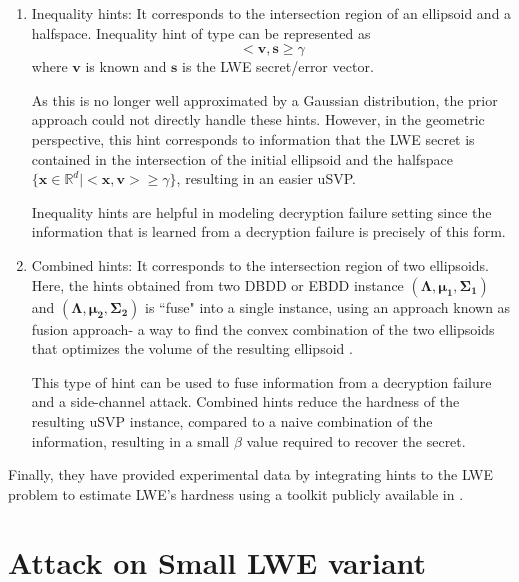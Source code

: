 \begin{enumerate}
    \item Inequality hints: It corresponds to the intersection region of an ellipsoid and a halfspace. Inequality hint of type can be represented as
          \begin{equation*}
              <\pmb{v},\pmb{s} \geq \gamma
          \end{equation*}
          where $\pmb{v}$ is known and $\pmb{s}$ is the LWE secret/error vector.

          As this is no longer well approximated by a Gaussian distribution, the prior approach could not directly handle these hints. However, in the geometric perspective, this hint corresponds to information that the LWE secret is contained in the intersection of the initial ellipsoid and the halfspace $\{ \pmb{x} \in \mathbb{R}^d | < \pmb{x, v} > \geq \gamma \}$, resulting in an easier uSVP.

          Inequality hints are helpful in modeling decryption failure setting since the information that is learned from a decryption failure is precisely of this form.

    \item Combined hints: It corresponds to the intersection region of two ellipsoids. Here, the hints obtained from two DBDD or EBDD instance $(\pmb{\Lambda,\mu_1,\Sigma_1})$ and $(\pmb{\Lambda,\mu_2,\Sigma_2})$ is ``fuse" into a single instance, using an approach known as fusion approach- a way to find the convex combination of the two ellipsoids that optimizes the volume of the resulting ellipsoid \cite{ros2002ellipsoidal,wang2019equivalence}.

          This type of hint can be used to fuse information from a decryption failure and a side-channel attack. Combined hints reduce the hardness of the resulting uSVP instance, compared to a naive combination of the information, resulting in a small $\beta$ value required to recover the secret.
\end{enumerate}

Finally, they have provided experimental data by integrating hints to the LWE problem to estimate LWE's hardness using a toolkit publicly available in \cite{HunterKippenToolkit}.






\section{Attack on Small LWE variant}

